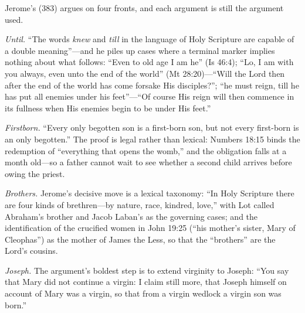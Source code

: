 Jerome's  (383)
argues on four fronts, and each argument is still the argument used.

\emph{Until.} ``The words \emph{knew} and \emph{till} in the language of
Holy Scripture are capable of a double meaning''---and he piles up cases
where a terminal marker implies nothing about what follows: ``Even to old
age I am he'' (Is 46:4); ``Lo, I am with you always, even unto the end of
the world'' (Mt 28:20)---``Will the Lord then after the end of the world
has come forsake His disciples?''; ``he must reign, till he has put all
enemies under his feet''---``Of course His reign will then commence in
its fullness when His enemies begin to be under His feet.''

\emph{Firstborn.} ``Every only begotten son is a first-born son, but not
every first-born is an only begotten.'' The proof is legal rather than
lexical: Numbers 18:15 binds the redemption of ``everything that opens
the womb,'' and the obligation falls at a month old---so a father cannot
wait to see whether a second child arrives before owing the
priest.

\emph{Brothers.} Jerome's decisive move is a lexical taxonomy: ``In Holy
Scripture there are four kinds of brethren---by nature, race, kindred,
love,'' with Lot called Abraham's brother and Jacob Laban's as the
governing cases; and the identification of the crucified women in John
19:25 (``his mother's sister, Mary of Cleophas'') as the mother of James
the Less, so that the ``brothers'' are the Lord's cousins.

\emph{Joseph.} The argument's boldest step is to extend virginity to
Joseph: ``You say that Mary did not continue a virgin: I claim still
more, that Joseph himself on account of Mary was a virgin, so that from a
virgin wedlock a virgin son was born.''

